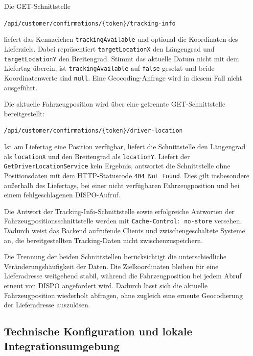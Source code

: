Die GET-Schnittstelle

\begin{center}
\texttt{/api/customer/confirmations/\{token\}/tracking-info}
\end{center}

liefert das Kennzeichen \texttt{trackingAvailable} und optional
die Koordinaten des Lieferziels. Dabei repräsentiert
\texttt{targetLocationX} den Längengrad und
\texttt{targetLocationY} den Breitengrad. Stimmt das aktuelle
Datum nicht mit dem Liefertag überein, ist
\texttt{trackingAvailable} auf \texttt{false} gesetzt und beide
Koordinatenwerte sind \texttt{null}. Eine Geocoding-Anfrage wird
in diesem Fall nicht ausgeführt.

Die aktuelle Fahrzeugposition wird über eine getrennte
GET-Schnittstelle bereitgestellt:

\begin{center}
\texttt{/api/customer/confirmations/\{token\}/driver-location}
\end{center}

Ist am Liefertag eine Position verfügbar, liefert
die Schnittstelle den Längengrad als \texttt{locationX} und den
Breitengrad als \texttt{locationY}. Liefert der
\texttt{GetDriverLocationService} kein Ergebnis, antwortet die
Schnittstelle ohne Positionsdaten mit dem HTTP-Statuscode
\texttt{404 Not Found}. Dies gilt insbesondere außerhalb des
Liefertags, bei einer nicht verfügbaren Fahrzeugposition und bei
einem fehlgeschlagenen DISPO-Aufruf.

Die Antwort der Tracking-Info-Schnittstelle sowie erfolgreiche
Antworten der Fahrzeugpositionsschnittstelle werden mit
\texttt{Cache-Control: no-store} versehen. Dadurch weist das
Backend aufrufende Clients und zwischengeschaltete Systeme an,
die bereitgestellten Tracking-Daten nicht zwischenzuspeichern.

Die Trennung der beiden Schnittstellen berücksichtigt die
unterschiedliche Veränderungshäufigkeit der Daten. Die
Zielkoordinaten bleiben für eine Lieferadresse weitgehend
stabil, während die Fahrzeugposition bei jedem Abruf erneut von
DISPO angefordert wird. Dadurch lässt sich die aktuelle
Fahrzeugposition wiederholt abfragen, ohne zugleich eine erneute
Geocodierung der Lieferadresse auszulösen.

\subsection{Technische Konfiguration und lokale Integrationsumgebung}
\label{sec:technische-konfiguration}

